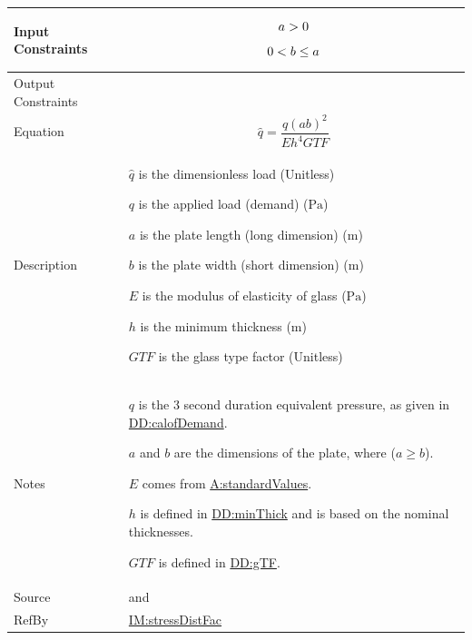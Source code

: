 \documentclass[12pt]{article}
\newcommand{\gt}{\ensuremath >}
\newcommand{\lt}{\ensuremath <}
\begin{document}
\begin{minipage}{\textwidth}
\begin{tabular}{>{\raggedright}p{}>{\raggedright\arraybackslash}p{}}
\\ \midrule
Input Constraints & \begin{displaymath}
                    a\gt{}0
                    \end{displaymath}
                    \begin{displaymath}
                    0\lt{}b\leq{}a
                    \end{displaymath}
\\ \midrule
Output Constraints & 
\\ \midrule
Equation & \begin{displaymath}
           \hat{q}=\frac{q \left(a b\right)^{2}}{E h^{4} \mathit{GTF}}
           \end{displaymath}
\\ \midrule
Description & \begin{symbDescription}
              \item{$\hat{q}$ is the dimensionless load (Unitless)}
              \item{$q$ is the applied load (demand) (${\text{Pa}}$)}
              \item{$a$ is the plate length (long dimension) (${\text{m}}$)}
              \item{$b$ is the plate width (short dimension) (${\text{m}}$)}
              \item{$E$ is the modulus of elasticity of glass (${\text{Pa}}$)}
              \item{$h$ is the minimum thickness (${\text{m}}$)}
              \item{$\mathit{GTF}$ is the glass type factor (Unitless)}
              \end{symbDescription}
\\ \midrule
Notes & $q$ is the 3 second duration equivalent pressure, as given in \hyperref[DD:calofDemand]{DD:calofDemand}.
        
        $a$ and $b$ are the dimensions of the plate, where ($a\geq{}b$).
        
        $E$ comes from \hyperref[assumpSV]{A:standardValues}.
        
        $h$ is defined in \hyperref[DD:minThick]{DD:minThick} and is based on the nominal thicknesses.
        
        $\mathit{GTF}$ is defined in \hyperref[DD:gTF]{DD:gTF}.
        
\\ \midrule
Source & \cite{astm2009} and \cite[(Eq. 7)]{campidelli}
         
\\ \midrule
RefBy & \hyperref[IM:stressDistFac]{IM:stressDistFac}
        
\\ \bottomrule
\end{tabular}
\end{minipage}
\end{document}
